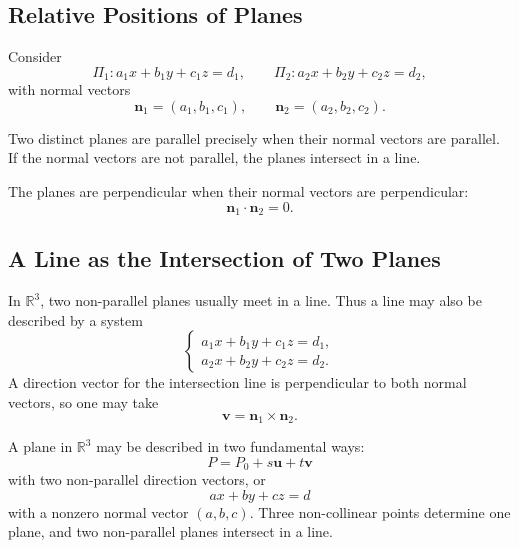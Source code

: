 \subsection{Relative Positions of Planes}

Consider
\[
\Pi_1:a_1x+b_1y+c_1z=d_1,
\qquad
\Pi_2:a_2x+b_2y+c_2z=d_2,
\]
with normal vectors
\[
\mathbf{n}_1=(a_1,b_1,c_1),
\qquad
\mathbf{n}_2=(a_2,b_2,c_2).
\]

\begin{theorembox}
Two distinct planes are parallel precisely when their normal vectors are
parallel. If the normal vectors are not parallel, the planes intersect in a
line.
\end{theorembox}

The planes are perpendicular when their normal vectors are perpendicular:
\[
\mathbf{n}_1\cdot\mathbf{n}_2=0.
\]

\subsection{A Line as the Intersection of Two Planes}

In $\mathbb{R}^3$, two non-parallel planes usually meet in a line. Thus a line
may also be described by a system
\[
\begin{cases}
a_1x+b_1y+c_1z=d_1,\\
a_2x+b_2y+c_2z=d_2.
\end{cases}
\]
A direction vector for the intersection line is perpendicular to both normal
vectors, so one may take
\[
\mathbf{v}=\mathbf{n}_1\times\mathbf{n}_2.
\]

\begin{summarybox}
A plane in $\mathbb{R}^3$ may be described in two fundamental ways:
\[
P=P_0+s\mathbf{u}+t\mathbf{v}
\]
with two non-parallel direction vectors, or
\[
ax+by+cz=d
\]
with a nonzero normal vector $(a,b,c)$. Three non-collinear points determine one
plane, and two non-parallel planes intersect in a line.
\end{summarybox}

